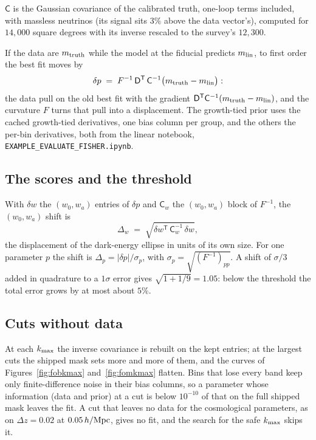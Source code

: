 \documentclass[11pt]{article}
\newcommand{\Cov}{\mathsf{C}}
\newcommand{\T}{^{\mathsf{T}}}
\newcommand{\kmax}{k_{\rm max}}
\newcommand{\hMpc}{\,h/{\rm Mpc}}
\begin{document}
$\Cov$ is the Gaussian covariance of the calibrated truth, one-loop
terms included, with massless neutrinos (its signal sits $3\%$ above
the data vector's), computed for $14{,}000$ square degrees with its
inverse rescaled to the survey's $12{,}300$.

If the data are $m_{\rm truth}$ while the model at the fiducial
predicts $m_{\rm lin}$, to first order the best fit moves by
\begin{equation}
  \delta p \;=\; F^{-1}\,\mathsf{D}\T\, \Cov^{-1}
  \bigl(m_{\rm truth} - m_{\rm lin}\bigr) :
  \label{eq:response}
\end{equation}
the data pull on the old best fit with the gradient
$\mathsf{D}\T \Cov^{-1}(m_{\rm truth} - m_{\rm lin})$, and the
curvature $F$ turns that pull into a displacement.  The growth-tied
prior uses the cached growth-tied derivatives, one bias column per
group, and the others the per-bin derivatives, both from the linear
notebook, \texttt{EXAMPLE\_EVALUATE\_FISHER.ipynb}.

\subsection{The scores and the threshold}
\label{sec:scores}

With $\delta w$ the $(w_0, w_a)$ entries of $\delta p$ and $\Cov_w$
the $(w_0, w_a)$ block of $F^{-1}$, the $(w_0, w_a)$ shift is
\begin{equation}
  \Delta_w \;=\; \sqrt{\delta w\T\, \Cov_w^{-1}\, \delta w} ,
  \label{eq:shiftw}
\end{equation}
the displacement of the dark-energy ellipse in units of its own size.
For one parameter $p$ the shift is $\Delta_p = |\delta p|/\sigma_p$,
with $\sigma_p = \sqrt{(F^{-1})_{pp}}$.  A shift of $\sigma/3$ added
in quadrature to a $1\sigma$ error gives $\sqrt{1 + 1/9} = 1.05$:
below the threshold the total error grows by at most about $5\%$.

\subsection{Cuts without data}
\label{sec:cut}

At each $\kmax$ the inverse covariance is rebuilt on the kept
entries; at the largest cuts the shipped mask sets more and more of
them, and the curves of Figures~\ref{fig:fobkmax}
and~\ref{fig:fomkmax} flatten.  Bins that lose every band keep only
finite-difference noise in their bias columns, so a parameter whose
information (data and prior) at a cut is below $10^{-10}$ of that on
the full shipped mask leaves the fit.  A cut that leaves no data for
the cosmological parameters, as on $\Delta z = 0.02$ at $0.05\hMpc$,
gives no fit, and the search for the safe $\kmax$ skips it.
\end{document}
